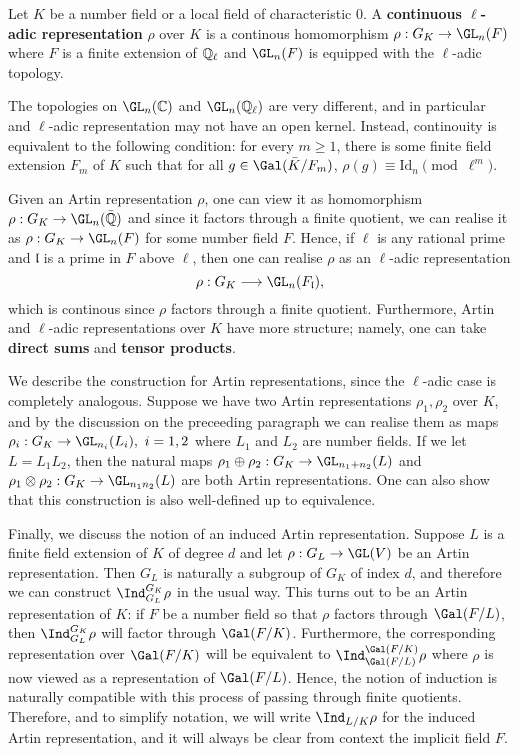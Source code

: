 \begin{defn}
    Let $K$ be a number field or a local field of characteristic $0$. A \textbf{continuous $\ell$-adic representation} $\rho$ over $K$ is a continous homomorphism $\rho:G_K\to\GL_n(F)$ where $F$ is a finite extension of $\mathbb{Q}_\ell$ and $\GL_n(F)$ is equipped with the $\ell$-adic topology.
\end{defn}

\begin{rem} \label{rem_cont_ladic}
    The topologies on $\GL_n(\CC)$ and $\GL_n(\QQ_\ell)$ are very different, and in particular and $\ell$-adic representation may not have an open kernel. Instead, continouity is equivalent to the following condition: for every $m\geq1$, there is some finite field extension $F_m$ of $K$ such that for all $g\in\Gal(\bar{K}/F_m)$, $\rho(g)\equiv \mathrm{Id}_n\pmod{\ell^m}$.
\end{rem}

Given an Artin representation $\rho$, one can view it as homomorphism $\rho:G_K\to\GL_n(\bar{\QQ})$ and since it factors through a finite quotient, we can realise it as $\rho:G_K\to\GL_n(F)$ for some number field $F$. Hence, if $\ell$ is any rational prime and $\mathfrak{l}$ is a prime in $F$ above $\ell$, then one can realise $\rho$ as an $\ell$-adic representation $$\rho:G_K\longrightarrow\GL_n(F_\mathfrak{l}),$$
which is continous since $\rho$ factors through a finite quotient. Furthermore, Artin and $\ell$-adic representations over $K$ have more structure; namely, one can take \textbf{direct sums} and \textbf{tensor products}.

We describe the construction for Artin representations, since the $\ell$-adic case is completely analogous. Suppose we have two Artin representations $\rho_1,\rho_2$ over $K$, and by the discussion on the preceeding paragraph we can realise them as maps $\rho_i:G_K\to\GL_{n_i}(L_i),\ i=1,2$ where $L_1$ and $L_2$ are number fields. If we let $L=L_1L_2$, then the natural maps $\rho_1\oplus\rho_2:G_K\to\GL_{n_1+n_2}(L)$ and $\rho_1\otimes\rho_2:G_K\to\GL_{n_1n_2}(L)$ are both Artin representations. One can also show that this construction is also well-defined up to equivalence.

Finally, we discuss the notion of an induced Artin representation. Suppose $L$ is a finite field extension of $K$ of degree $d$ and let $\rho:G_L\to\GL(V)$ be an Artin representation. Then $G_L$ is naturally a subgroup of $G_K$ of index $d$, and therefore we can construct $\Ind_{G_L}^{G_K}\rho$ in the usual way. This turns out to be an Artin representation of $K$: if $F$ be a number field so that $\rho$ factors through $\Gal(F/L)$, then $\Ind_{G_L}^{G_K}\rho$ will factor through $\Gal(F/K)$. Furthermore, the corresponding representation over $\Gal(F/K)$ will be equivalent to $\Ind_{\Gal(F/L)}^{\Gal(F/K)}\rho$ where $\rho$ is now viewed as a representation of $\Gal(F/L)$. Hence, the notion of induction is naturally compatible with this process of passing through finite quotients. Therefore, and to simplify notation, we will write $\Ind_{L/K}\rho$ for the induced Artin representation, and it will always be clear from context the implicit field $F$.

